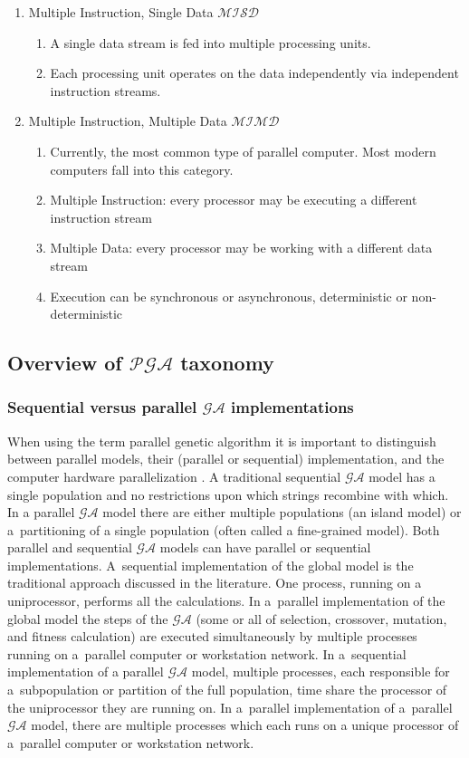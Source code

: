 \begin{enumerate}
	\item Multiple Instruction, Single Data $\mathcal{MISD}$
		\begin{enumerate}
			\item A single data stream is fed into multiple processing units. 
			\item Each processing unit operates on the data independently via independent instruction streams.
		\end{enumerate}
	\item Multiple Instruction, Multiple Data $\mathcal{MIMD}$
		\begin{enumerate}
			\item Currently, the most common type of parallel computer. Most modern computers fall into this category. 
			\item Multiple Instruction: every processor may be executing a different instruction stream 
			\item Multiple Data: every processor may be working with a different data stream 
			\item Execution can be synchronous or asynchronous, deterministic or non-deterministic 
		\end{enumerate}
\end{enumerate}

\subsection{Overview of $\mathcal{PGA}$ taxonomy }
\label{cha:PgaTaxonomy}

\subsubsection{Sequential versus parallel $\mathcal{GA}$ implementations}
\label{cha:GaDifference}
When using the term parallel genetic algorithm it is important to distinguish between parallel models,
their (parallel or sequential) implementation, and the computer hardware
parallelization \cite{bib20}. A traditional sequential $\mathcal{GA}$ model has a single population and no restrictions
upon which strings recombine with which. In a parallel $\mathcal{GA}$ model there are either multiple
populations (an island model) or a~partitioning of a single population (often called a fine-grained model). 
Both parallel and sequential $\mathcal{GA}$ models can have parallel or sequential implementations.
A~sequential implementation of the global model is the traditional approach discussed 
in the literature. One process, running on a uniprocessor, performs all the calculations. 
In a~parallel implementation of the global model the steps of the $\mathcal{GA}$ (some or all of selection, crossover,
mutation, and fitness calculation) are executed simultaneously by multiple
processes running on a~parallel computer or workstation network.
In a~sequential implementation of a parallel $\mathcal{GA}$ model, multiple processes, each
responsible for a~subpopulation or partition of the full population, time share the processor 
of the uniprocessor they are running on. In a~parallel implementation of a~parallel $\mathcal{GA}$ model, 
there are multiple processes which each runs on a unique processor of a~parallel computer or workstation network.


